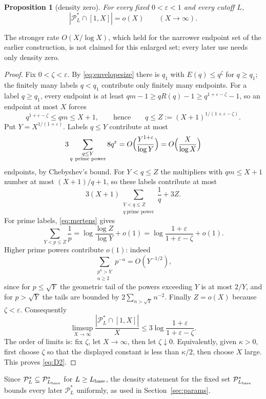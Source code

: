 \documentclass[11pt,letterpaper]{article}
\numberwithin{equation}{section}
\theoremstyle{plain}
\newtheorem{proposition}{Proposition}
\theoremstyle{remark}
\newcommand{\cP}{\mathcal P}
\begin{document}
\begin{proposition}[density zero]\label{prop:density}
For every fixed $0<\varepsilon<1$ and every cutoff $L$,
\begin{equation}\label{eq:D2}
|\cP^*_L\cap[1,X]|=o(X)\qquad(X\to\infty).
\end{equation}
\end{proposition}

The stronger rate $O(X/\log X)$, which held for the narrower endpoint set of the earlier construction, is not claimed for this enlarged set; every later use needs only density zero.

\begin{proof}
Fix $0<\zeta<\varepsilon$. By \eqref{eq:envelopesize} there is $q_1$ with $E(q)\le q^\zeta$ for $q\ge q_1$; the finitely many labels $q<q_1$ contribute only finitely many endpoints. For a label $q\ge q_1$, every endpoint is at least $qm-1\ge qR(q)-1\ge q^{1+\varepsilon-\zeta}-1$, so an endpoint at most $X$ forces
\[
q^{1+\varepsilon-\zeta}\le qm\le X+1,\qquad\text{hence}\qquad q\le Z:=(X+1)^{1/(1+\varepsilon-\zeta)} .
\]
Put $Y=X^{1/(1+\varepsilon)}$. Labels $q\le Y$ contribute at most
\[
3\sum_{\substack{q\le Y\\ q\ \text{prime power}}}8q^\varepsilon=O\Bigl(\frac{Y^{1+\varepsilon}}{\log Y}\Bigr)=O\Bigl(\frac X{\log X}\Bigr)
\]
endpoints, by Chebyshev's bound. For $Y<q\le Z$ the multipliers with $qm\le X+1$ number at most $(X+1)/q+1$, so these labels contribute at most
\[
3(X+1)\sum_{\substack{Y<q\le Z\\ q\ \text{prime power}}}\frac1q+3Z .
\]
For prime labels, \eqref{eq:mertens} gives
\[
\sum_{Y<p\le Z}\frac1p=\log\frac{\log Z}{\log Y}+o(1)=\log\frac{1+\varepsilon}{1+\varepsilon-\zeta}+o(1).
\]
Higher prime powers contribute $o(1)$: indeed
\[
\sum_{\substack{p^a>Y\\ a\ge2}}p^{-a}=O(Y^{-1/2}),
\]
since for $p\le\sqrt Y$ the geometric tail of the powers exceeding $Y$ is at most $2/Y$, and for $p>\sqrt Y$ the tails are bounded by $2\sum_{n>\sqrt Y}n^{-2}$. Finally $Z=o(X)$ because $\zeta<\varepsilon$. Consequently
\[
\limsup_{X\to\infty}\frac{|\cP^*_L\cap[1,X]|}X\le3\log\frac{1+\varepsilon}{1+\varepsilon-\zeta}.
\]
The order of limits is: fix $\zeta$, let $X\to\infty$, then let $\zeta\downarrow0$. Equivalently, given $\kappa>0$, first choose $\zeta$ so that the displayed constant is less than $\kappa/2$, then choose $X$ large. This proves \eqref{eq:D2}.
\end{proof}

Since $\cP^*_L\subseteq\cP^*_{L_{\rm base}}$ for $L\ge L_{\rm base}$, the density statement for the fixed set $\cP^*_{L_{\rm base}}$ bounds every later $\cP^*_L$ uniformly, as used in Section~\ref{sec:params}.
\end{document}
